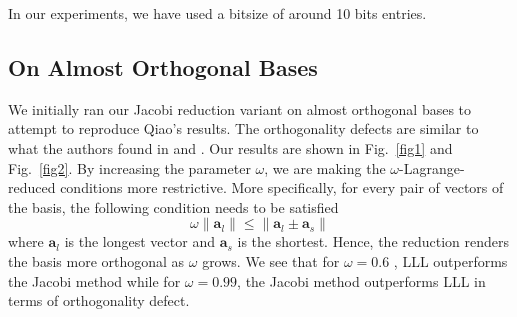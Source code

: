 \documentclass[10pt, a4paper]{article}
\renewcommand{\vec}[1]{\mathbf{#1}}
\begin{document}
In our experiments, we have used a bitsize of around 10 bits entries.

\subsection{On Almost Orthogonal Bases}

We initially ran our Jacobi reduction variant on almost orthogonal bases to attempt to reproduce Qiao's results. The orthogonality defects are similar to what the authors found in \cite{tian2014hybrid} and \cite{fastJacobi}. Our results are shown in Fig.~\ref{fig1} and Fig.~\ref{fig2}. By increasing the parameter $\omega$, we are making the $\omega$-Lagrange-reduced conditions more restrictive. More specifically, for every pair of vectors of the basis, the following condition needs to be satisfied
\[
 \omega \| \vec{a}_l \| \leq \|\vec{a}_l \pm \vec{a}_s \|
\] where $\vec{a}_l$ is the longest vector and $\vec{a}_s$ is the shortest. Hence, the reduction renders the basis more orthogonal as $\omega$ grows. We see that for $\omega=0.6$ , LLL outperforms the Jacobi method while for $\omega = 0.99$, the Jacobi method outperforms LLL in terms of orthogonality defect.
\end{document}
